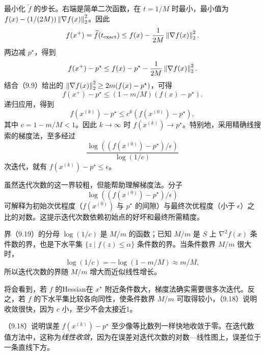 最小化 $\widetilde f$ 的步长。右端是简单二次函数，在 $t=1/M$ 时最小，最小值为 $f(x)-(1/(2M))\left\lVert \nabla f(x)\right\rVert_2^2$。因此
\[
f(x^+)=\widetilde f(t_{\mathrm{exact}})
\le f(x)-\frac1{2M}\left\lVert \nabla f(x)\right\rVert_2^2.
\]
两边减 $p^\star$，得到
\[
f(x^+)-p^\star\le f(x)-p^\star-\frac1{2M}\left\lVert \nabla f(x)\right\rVert_2^2.
\]
结合（9.9）给出的 $\left\lVert \nabla f(x)\right\rVert_2^2\ge2m(f(x)-p^\star)$，可得
\[
f(x^+)-p^\star\le(1-m/M)(f(x)-p^\star).
\]
递归应用，得到
\begin{equation}
f(x^{(k)})-p^\star\le c^k(f(x^{(0)})-p^\star),\tag{9.18}
\end{equation}
其中 $c=1-m/M<1$。因此 $k\to\infty$ 时 $f(x^{(k)})\to p^\star$。特别地，采用精确线搜索的梯度法，至多经过
\begin{equation}
\frac{\log((f(x^{(0)})-p^\star)/\epsilon)}{\log(1/c)}\tag{9.19}
\end{equation}
次迭代，就有 $f(x^{(k)})-p^\star\le\epsilon$。

虽然迭代次数的这一界较粗，但能帮助理解梯度法。分子
\[
\log((f(x^{(0)})-p^\star)/\epsilon)
\]
可解释为初始次优程度（$f(x^{(0)})$ 与 $p^\star$ 的间隙）与最终次优程度（小于 $\epsilon$）之比的对数。这提示迭代次数依赖初始点的好坏和最终所需精度。

界（9.19）的分母 $\log(1/c)$ 是 $M/m$ 的函数；已知 $M/m$ 是 $S$ 上 $\nabla^2f(x)$ 条件数的界，也是下水平集 $\{z\mid f(z)\le\alpha\}$ 条件数的界。当条件数界 $M/m$ 很大时，
\[
\log(1/c)=-\log(1-m/M)\approx m/M,
\]
所以迭代次数的界随 $M/m$ 增大而近似线性增长。

将会看到，若 $f$ 的Hessian在 $x^\star$ 附近条件数大，梯度法确实需要很多次迭代。反之，若 $f$ 的下水平集比较各向同性，使条件数界 $M/m$ 可取得较小，（9.18）说明收敛很快，因为 $c$ 小，至少不会太接近1。

（9.18）说明误差 $f(x^{(k)})-p^\star$ 至少像等比数列一样快地收敛于零。在迭代数值方法中，这称为\emph{线性收敛}，因为在误差对迭代次数的对数—线性图上，误差位于一条直线下方。

